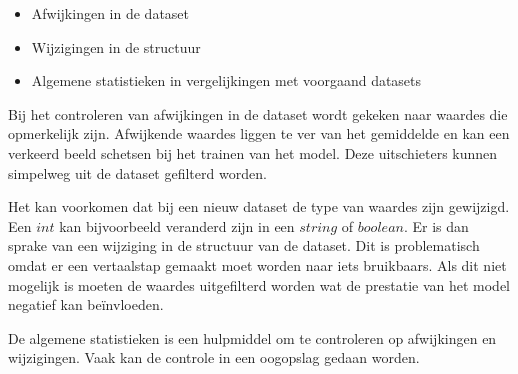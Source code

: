 \begin{itemize}
  \item Afwijkingen in de dataset
  \item Wijzigingen in de structuur
  \item Algemene statistieken in vergelijkingen met voorgaand datasets \cite[p.~44]{building-machine-learning-pipelines-oreilly}
\end{itemize}

Bij het controleren van afwijkingen in de dataset wordt gekeken naar waardes die opmerkelijk zijn. Afwijkende waardes liggen te ver van het gemiddelde en kan een verkeerd beeld schetsen bij het trainen van het model. Deze uitschieters kunnen simpelweg uit de dataset gefilterd worden.

Het kan voorkomen dat bij een nieuw dataset de type van waardes zijn gewijzigd. Een \(int\) kan bijvoorbeeld veranderd zijn in een \(string\) of \(boolean\). Er is dan sprake van een wijziging in de structuur van de dataset. Dit is problematisch omdat er een vertaalstap gemaakt moet worden naar iets bruikbaars. Als dit niet mogelijk is moeten de waardes uitgefilterd worden wat de prestatie van het model negatief kan beïnvloeden.

De algemene statistieken is een hulpmiddel om te controleren op afwijkingen en wijzigingen. Vaak kan de controle in een oogopslag gedaan worden. 





